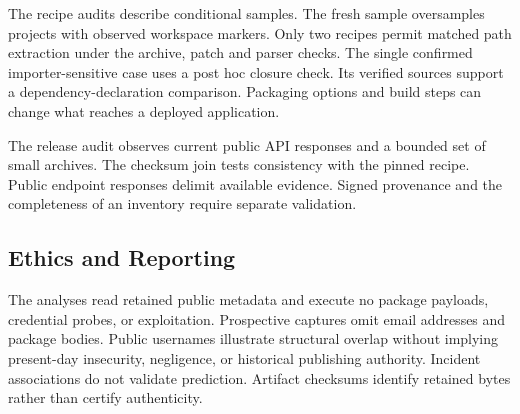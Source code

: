 The recipe audits describe conditional samples. The fresh sample oversamples projects with observed workspace markers. Only two recipes permit matched path extraction under the archive, patch and parser checks. The single confirmed importer-sensitive case uses a post hoc closure check. Its verified sources support a dependency-declaration comparison. Packaging options and build steps can change what reaches a deployed application.

The release audit observes current public API responses and a bounded set of small archives. The checksum join tests consistency with the pinned recipe. Public endpoint responses delimit available evidence. Signed provenance and the completeness of an inventory require separate validation.

\subsection{Ethics and Reporting}
The analyses read retained public metadata and execute no package payloads, credential probes, or exploitation. Prospective captures omit email addresses and package bodies. Public usernames illustrate structural overlap without implying present-day insecurity, negligence, or historical publishing authority. Incident associations do not validate prediction. Artifact checksums identify retained bytes rather than certify authenticity.
